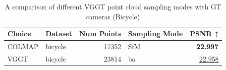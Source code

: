 \begin{table}[H]
\caption{\ifdefined\customcaption \customcaption \else A comparison of different VGGT point cloud sampling modes with GT cameras (Bicycle) \fi}
\label{tab:03_sampling_mode_brief_bicycle}
\centering
\scriptsize
\begin{tabular}{llrlr}
\toprule
Choice & Dataset & Num Points & Sampling Mode & PSNR ↑ \\
\midrule
COLMAP & bicycle & 17352 & SfM & \textbf{22.997} \\
VGGT & bicycle & 23814 & ba & \underline{22.958} \\
\bottomrule
\end{tabular}
\end{table}